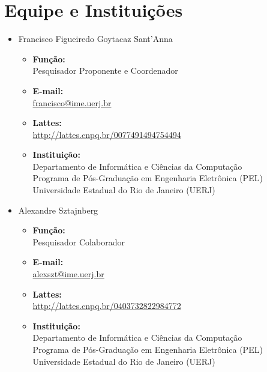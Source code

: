 \documentclass[titlepage,12pt]{article}
\begin{document}
\section{Equipe e Instituições}

\begin{itemize}
    \item Francisco Figueiredo Goytacaz Sant'Anna
    \begin{itemize}
        \item \textbf{Função:} \\
              Pesquisador Proponente e Coordenador
        \item \textbf{E-mail:} \\
              \url{francisco@ime.uerj.br}
        \item \textbf{Lattes:} \\
              \url{http://lattes.cnpq.br/0077491494754494}
        \item \textbf{Instituição:}                                     \\
              Departamento de Informática e Ciências da Computação      \\
              Programa de Pós-Graduação em Engenharia Eletrônica (PEL)  \\
              Universidade Estadual do Rio de Janeiro (UERJ)
    \end{itemize}

    \item Alexandre Sztajnberg
    \begin{itemize}
        \item \textbf{Função:} \\
              Pesquisador Colaborador
        \item \textbf{E-mail:} \\
              \url{alexszt@ime.uerj.br}
        \item \textbf{Lattes:} \\
              \url{http://lattes.cnpq.br/0403732822984772}
        \item \textbf{Instituição:}                                     \\
              Departamento de Informática e Ciências da Computação      \\
              Programa de Pós-Graduação em Engenharia Eletrônica (PEL)  \\
              Universidade Estadual do Rio de Janeiro (UERJ)
    \end{itemize}
\end{itemize}
\end{document}
